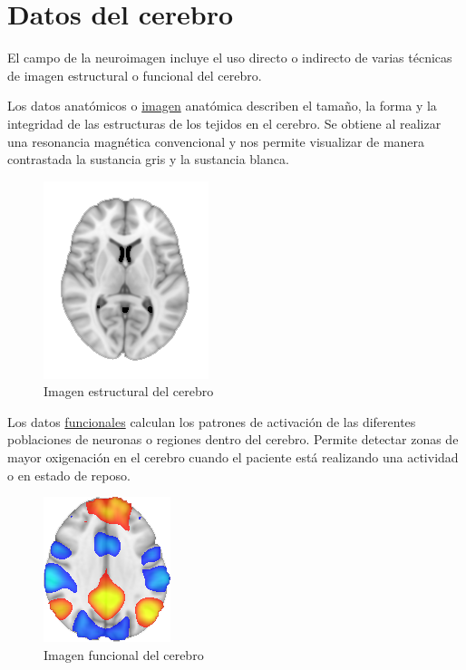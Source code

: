 \section{Datos del cerebro}

El campo de la neuroimagen incluye el uso directo o indirecto de varias técnicas de imagen estructural o funcional del cerebro.

Los datos anatómicos o \hyperref[eda:anat]{imagen} anatómica describen el tamaño, la forma y la integridad de las estructuras de los tejidos en el cerebro. Se obtiene al realizar una resonancia magnética convencional y nos permite visualizar de manera contrastada la sustancia gris y la sustancia blanca.

\begin{figure}[H]
  \centering
    \includegraphics[scale=0.75]{img/anat.png}
  \caption{Imagen estructural del cerebro}\label{eda:anat}
\end{figure}

Los datos \hyperref[eda:func]{funcionales} calculan los patrones de activación de las diferentes poblaciones de neuronas o regiones dentro del cerebro. Permite detectar zonas de mayor oxigenación en el cerebro cuando el paciente está realizando una actividad o en estado de reposo.

\begin{figure}[H]
  \centering
    \includegraphics[scale=0.75]{img/func.png}
  \caption{Imagen funcional del cerebro}\label{eda:func}
\end{figure}
\cite{brainhack,fmri_oxford}

